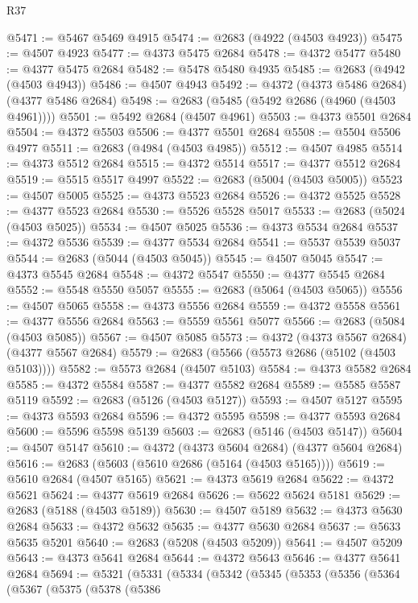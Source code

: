 \begin{lexlean}{R37}
\begin{coremodule}
@5471 := @5467 @5469 @4915
@5474 := @2683 (@4922 (@4503 @4923))
@5475 := @4507 @4923
@5477 := @4373 @5475 @2684
@5478 := @4372 @5477
@5480 := @4377 @5475 @2684
@5482 := @5478 @5480 @4935
@5485 := @2683 (@4942 (@4503 @4943))
@5486 := @4507 @4943
@5492 := @4372 (@4373 @5486 @2684) (@4377 @5486 @2684)
@5498 := @2683 (@5485 (@5492 @2686 (@4960 (@4503 @4961))))
@5501 := @5492 @2684 (@4507 @4961)
@5503 := @4373 @5501 @2684
@5504 := @4372 @5503
@5506 := @4377 @5501 @2684
@5508 := @5504 @5506 @4977
@5511 := @2683 (@4984 (@4503 @4985))
@5512 := @4507 @4985
@5514 := @4373 @5512 @2684
@5515 := @4372 @5514
@5517 := @4377 @5512 @2684
@5519 := @5515 @5517 @4997
@5522 := @2683 (@5004 (@4503 @5005))
@5523 := @4507 @5005
@5525 := @4373 @5523 @2684
@5526 := @4372 @5525
@5528 := @4377 @5523 @2684
@5530 := @5526 @5528 @5017
@5533 := @2683 (@5024 (@4503 @5025))
@5534 := @4507 @5025
@5536 := @4373 @5534 @2684
@5537 := @4372 @5536
@5539 := @4377 @5534 @2684
@5541 := @5537 @5539 @5037
@5544 := @2683 (@5044 (@4503 @5045))
@5545 := @4507 @5045
@5547 := @4373 @5545 @2684
@5548 := @4372 @5547
@5550 := @4377 @5545 @2684
@5552 := @5548 @5550 @5057
@5555 := @2683 (@5064 (@4503 @5065))
@5556 := @4507 @5065
@5558 := @4373 @5556 @2684
@5559 := @4372 @5558
@5561 := @4377 @5556 @2684
@5563 := @5559 @5561 @5077
@5566 := @2683 (@5084 (@4503 @5085))
@5567 := @4507 @5085
@5573 := @4372 (@4373 @5567 @2684) (@4377 @5567 @2684)
@5579 := @2683 (@5566 (@5573 @2686 (@5102 (@4503 @5103))))
@5582 := @5573 @2684 (@4507 @5103)
@5584 := @4373 @5582 @2684
@5585 := @4372 @5584
@5587 := @4377 @5582 @2684
@5589 := @5585 @5587 @5119
@5592 := @2683 (@5126 (@4503 @5127))
@5593 := @4507 @5127
@5595 := @4373 @5593 @2684
@5596 := @4372 @5595
@5598 := @4377 @5593 @2684
@5600 := @5596 @5598 @5139
@5603 := @2683 (@5146 (@4503 @5147))
@5604 := @4507 @5147
@5610 := @4372 (@4373 @5604 @2684) (@4377 @5604 @2684)
@5616 := @2683 (@5603 (@5610 @2686 (@5164 (@4503 @5165))))
@5619 := @5610 @2684 (@4507 @5165)
@5621 := @4373 @5619 @2684
@5622 := @4372 @5621
@5624 := @4377 @5619 @2684
@5626 := @5622 @5624 @5181
@5629 := @2683 (@5188 (@4503 @5189))
@5630 := @4507 @5189
@5632 := @4373 @5630 @2684
@5633 := @4372 @5632
@5635 := @4377 @5630 @2684
@5637 := @5633 @5635 @5201
@5640 := @2683 (@5208 (@4503 @5209))
@5641 := @4507 @5209
@5643 := @4373 @5641 @2684
@5644 := @4372 @5643
@5646 := @4377 @5641 @2684
@5694 := @5321
    (@5331
      (@5334
        (@5342
          (@5345
            (@5353
              (@5356
                (@5364
                  (@5367
                    (@5375
                      (@5378
                        (@5386

\end{coremodule}
\end{lexlean}
